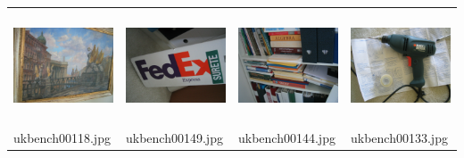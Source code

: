 \begin{tabular}{p{1.3in} p{1.3in} p{1.3in} p{1.3in} }
\includegraphics[keepaspectratio=false, height=1.3in, width=1.3in]{../datasets/ukbench-test/ukbench00118.jpg} & \includegraphics[keepaspectratio=false, height=1.3in, width=1.3in]{../datasets/ukbench-training/ukbench00149.jpg} & \includegraphics[keepaspectratio=false, height=1.3in, width=1.3in]{../datasets/ukbench-training/ukbench00144.jpg} & \includegraphics[keepaspectratio=false, height=1.3in, width=1.3in]{../datasets/ukbench-training/ukbench00133.jpg}\\
ukbench00118.jpg & ukbench00149.jpg & ukbench00144.jpg & ukbench00133.jpg\\
\end{tabular}

